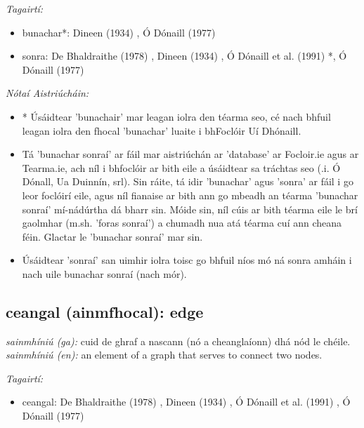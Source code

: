 \documentclass{article}
\begin{document}
 \noindent \textit{Tagairtí:}
\begin{itemize}
	\item bunachar*: Dineen (1934) \cite{dineen}, Ó Dónaill (1977) \cite{odonaill}
	\item sonra: De Bhaldraithe (1978) \cite{de-bhaldraithe}, Dineen (1934) \cite{dineen}, Ó Dónaill et al. (1991) \cite{focloir-beag}*, Ó Dónaill (1977) \cite{odonaill}
\end{itemize}

 \noindent \textit{Nótaí Aistriúcháin:}
\begin{itemize}
	\item * Úsáidtear 'bunachair' mar leagan iolra den téarma seo, cé nach bhfuil leagan iolra den fhocal 'bunachar' luaite i bhFoclóir Uí Dhónaill.
	\item Tá 'bunachar sonraí' ar fáil mar aistriúchán ar 'database' ar Focloir.ie agus ar Tearma.ie, ach níl i bhfoclóir ar bith eile a úsáidtear sa tráchtas seo (.i. Ó Dónall, Ua Duinnín, srl). Sin ráite, tá idir 'bunachar' agus 'sonra' ar fáil i go leor foclóirí eile, agus níl fianaise ar bith ann go mbeadh an téarma 'bunachar sonraí' mí-nádúrtha dá bharr sin. Móide sin, níl cúis ar bith téarma eile le brí gaolmhar (m.sh. 'foras sonraí') a chumadh nua atá téarma cuí ann cheana féin. Glactar le 'bunachar sonraí' mar sin.
	\item Úsáidtear 'sonraí' san uimhir iolra toisc go bhfuil níos mó ná sonra amháin i nach uile bunachar sonraí (nach mór).
\end{itemize}


\subsection*{ceangal (ainmfhocal): edge} 
 \noindent \textit{sainmhíniú (ga):} cuid de ghraf a nascann (nó a cheanglaíonn) dhá nód le chéile.
\newline\newline
 \noindent \textit{sainmhíniú (en):} an element of a graph that serves to connect two nodes.
\newline

 \noindent \textit{Tagairtí:}
\begin{itemize}
	\item ceangal: De Bhaldraithe (1978) \cite{de-bhaldraithe}, Dineen (1934) \cite{dineen}, Ó Dónaill et al. (1991) \cite{focloir-beag}, Ó Dónaill (1977) \cite{odonaill}
\end{itemize}
\end{document}
